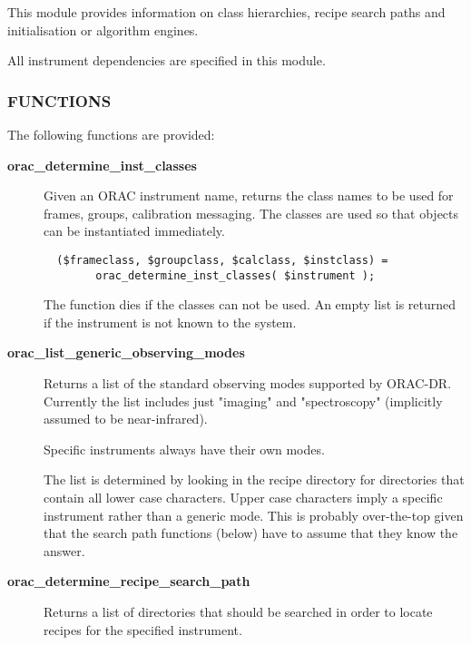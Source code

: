 This module provides information on class hierarchies, recipe
search paths and initialisation or algorithm engines.



All instrument dependencies are specified in this module.

\subsubsection*{FUNCTIONS\label{ORAC::Inst::Defn_FUNCTIONS}}


The following functions are provided:

\begin{description}

\item[\textbf{orac\_determine\_inst\_classes}] \mbox{}

Given an ORAC instrument name, returns the class names to be
used for frames, groups, calibration messaging. The classes
are used so that objects can be instantiated immediately.

\begin{verbatim}
  ($frameclass, $groupclass, $calclass, $instclass) =
        orac_determine_inst_classes( $instrument );
\end{verbatim}


The function dies if the classes can not be used.
An empty list is returned if the instrument is not known
to the system.


\item[\textbf{orac\_list\_generic\_observing\_modes}] \mbox{}

Returns a list of the standard observing modes supported
by ORAC-DR. Currently the list includes just "imaging"
and "spectroscopy" (implicitly assumed to be near-infrared).



Specific instruments always have their own modes.



The list is determined by looking in the recipe directory for
directories that contain all lower case characters.  Upper case
characters imply a specific instrument rather than a generic
mode. This is probably over-the-top given that the search path
functions (below) have to assume that they know the answer.


\item[\textbf{orac\_determine\_recipe\_search\_path}] \mbox{}

Returns a list of directories that should be searched in order
to locate recipes for the specified instrument.


\end{description}
